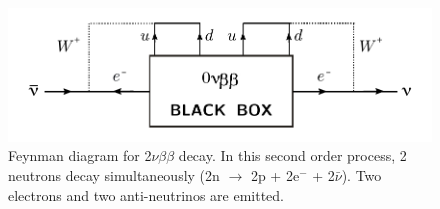\documentclass[main.tex]{subfiles}
\begin{document}
\begin{figure}[h!]
\begin{center}
\includegraphics[scale=0.8]{pictures/Chap2/0nubbBlackBox.pdf}
\caption{Feynman diagram for 2$\nu\beta\beta$ decay. In this second order process, 2 neutrons decay simultaneously (2n $\rightarrow$ 2p + 2e$^-$ + 2$\bar{\nu}$). Two electrons and two anti-neutrinos are emitted.}
\label{0nubbBlackBox}
\end{center}
\end{figure}
\end{document}
